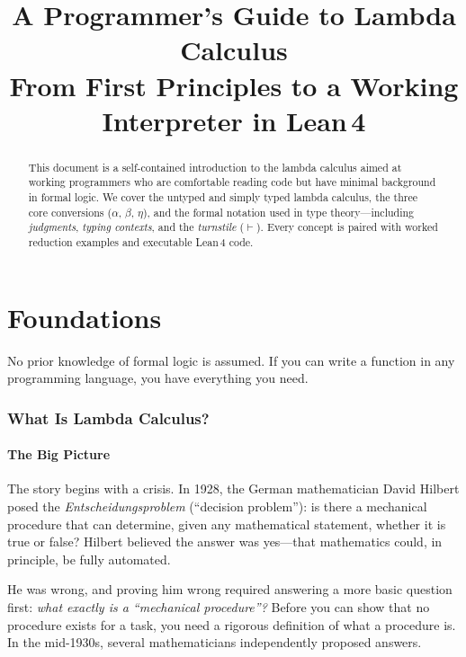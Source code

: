\documentclass[11pt,a4paper]{article}
\title{%
  \vspace{-1cm}
  {\LARGE\bfseries A Programmer's Guide to Lambda Calculus}\\[8pt]
  {\large From First Principles to a Working Interpreter in Lean\,4}
}
\author{}
\date{}
\theoremstyle{definition}
\newcommand{\proves}{\vdash}
\begin{document}
\maketitle
\thispagestyle{fancy}

\begin{abstract}
\noindent
This document is a self-contained introduction to the lambda calculus aimed at
working programmers who are comfortable reading code but have minimal background
in formal logic. We cover the untyped and simply typed lambda calculus, the
three core conversions ($\alpha$, $\beta$, $\eta$), and the formal
notation used in type theory---including \emph{judgments}, \emph{typing contexts}, and
the \emph{turnstile} ($\proves$). Every concept is paired with worked reduction
examples and executable Lean\,4 code.
\end{abstract}

\tableofcontents
\newpage

\part{Foundations}

No prior knowledge of formal logic is assumed. If you can write a function in any programming language, you have everything you need.

\section{What Is Lambda Calculus?}\label{sec:what}

\subsection{The Big Picture}

The story begins with a crisis. In 1928, the German mathematician David
Hilbert posed the \emph{Entscheidungsproblem} (``decision problem''): is there
a mechanical procedure that can determine, given any mathematical statement,
whether it is true or false? Hilbert believed the answer was yes---that
mathematics could, in principle, be fully automated.

He was wrong, and proving him wrong required answering a more basic question
first: \emph{what exactly is a ``mechanical procedure''?} Before you can show
that no procedure exists for a task, you need a rigorous definition of what a
procedure is. In the mid-1930s, several mathematicians independently proposed
answers.
\end{document}
